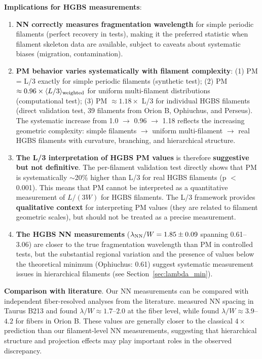 \documentclass[twoside,twocolumn]{mnras}
\begin{document}
\textbf{Implications for HGBS measurements}:
\begin{enumerate}
    \item \textbf{NN correctly measures fragmentation wavelength} for simple periodic filaments (perfect recovery in tests), making it the preferred statistic when filament skeleton data are available, subject to caveats about systematic biases (migration, contamination).
    \item \textbf{PM behavior varies systematically with filament complexity}: (1) PM = L/3 exactly for simple periodic filaments (synthetic test); (2) PM $\approx 0.96 \times \langle L/3 \rangle_{\rm weighted}$ for uniform multi-filament distributions (computational test); (3) PM $\approx 1.18 \times$ L/3 for individual HGBS filaments (direct validation test, 39 filaments from Orion B, Ophiuchus, and Perseus). The systematic increase from 1.0 $\to$ 0.96 $\to$ 1.18 reflects the increasing geometric complexity: simple filaments $\to$ uniform multi-filament $\to$ real HGBS filaments with curvature, branching, and hierarchical structure.
    \item \textbf{The L/3 interpretation of HGBS PM values} is therefore \textbf{suggestive but not definitive}. The per-filament validation test directly shows that PM is systematically $\sim$20\% higher than L/3 for real HGBS filaments (p $<$ 0.001). This means that PM cannot be interpreted as a quantitative measurement of $L/(3W)$ for HGBS filaments. The L/3 framework provides \textbf{qualitative context} for interpreting PM values (they are related to filament geometric scales), but should not be treated as a precise measurement.
    \item \textbf{The HGBS NN measurements} ($\lambda_{\rm NN}/W = 1.85 \pm 0.09$ spanning 0.61--3.06) are closer to the true fragmentation wavelength than PM in controlled tests, but the substantial regional variation and the presence of values below the theoretical minimum (Ophiuchus: 0.61) suggest systematic measurement issues in hierarchical filaments (see Section~\ref{sec:lambda_min}).
\end{enumerate}

\textbf{Comparison with literature}. Our NN measurements can be compared with independent fiber-resolved analyses from the literature. \citet{Hacar2013} measured NN spacing in Taurus B213 and found $\lambda/W \approx 1.7$--$2.0$ at the fiber level, while \citet{Yang2024} found $\lambda/W \approx 3.9$--$4.2$ for fibers in Orion B. These values are generally closer to the classical $4\times$ prediction than our filament-level NN measurements, suggesting that hierarchical structure and projection effects may play important roles in the observed discrepancy.
\end{document}
